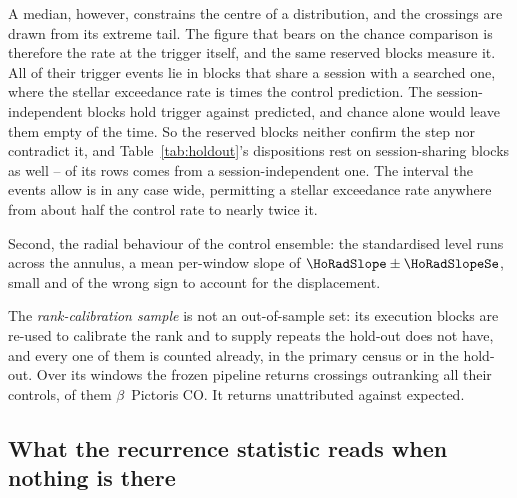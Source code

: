 A median, however, constrains the centre of a distribution, and the
crossings are drawn from its extreme tail. The figure that bears on the
chance comparison is therefore the rate at the trigger itself, and the same
reserved blocks measure it. All \StHoObs{} of their trigger events lie in
blocks that share a session with a searched one, where the stellar exceedance
rate is \HsShareRatio{} times the control prediction. The
\HsIndBlocks{} session-independent blocks hold \HsIndObsWord{} trigger
\HsIndObsNoun{}
against \HsIndExp{} predicted, and chance alone would leave them empty
\HsIndPNone{} of the time. So the reserved blocks neither confirm the step nor
contradict it, and Table~\ref{tab:holdout}'s dispositions rest on
session-sharing blocks as well -- \HsIndDispoWord{} of its rows comes from a
session-independent one. The interval the \StHoObs{} events allow is in any
case wide, permitting a stellar exceedance rate anywhere from about half the
control rate to nearly twice it.

Second, the radial behaviour of the control ensemble: the standardised level
runs \HoRadBins{} across the annulus, a mean per-window slope of
$\HoRadSlope\pm\HoRadSlopeSe$, small and of the wrong sign to account for the
displacement.

The \emph{rank-calibration sample} is not an out-of-sample set: its
\CampBlocks{} execution blocks are re-used to calibrate the rank and to supply
repeats the hold-out does not have, and every one of them is counted already,
in the primary census or in the hold-out. Over its \CampWindows{}
windows the frozen pipeline returns \CampStageOne{} crossings outranking all
their controls, \CampStageOneCO{} of them $\beta$~Pictoris CO. It returns
\CampUnattrib{} unattributed against \CampExpUn{} expected.

\subsection{What the recurrence statistic reads when nothing is there}

